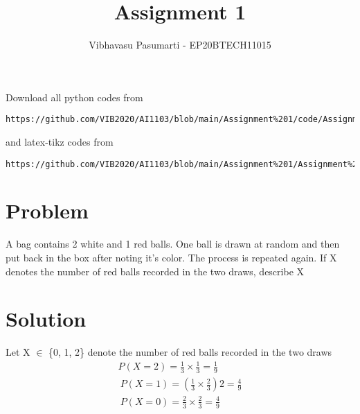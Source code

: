 \documentclass[journal,12pt,twocolumn]{IEEEtran}
\begin{document}
\title{Assignment 1}
\author{Vibhavasu Pasumarti - EP20BTECH11015}
\maketitle
\newpage
\bigskip
\renewcommand{\thefigure}{\theenumi}
\renewcommand{\thetable}{\theenumi}
Download all python codes from 
\begin{lstlisting}
https://github.com/VIB2020/AI1103/blob/main/Assignment%201/code/Assignment_1.py
\end{lstlisting}
%
and latex-tikz codes from 
%
\begin{lstlisting}
https://github.com/VIB2020/AI1103/blob/main/Assignment%201/Assignment%201.tex
\end{lstlisting}
\section{Problem}
A bag contains 2 white and 1 red balls. One ball is 
drawn at random and then put back in the box after 
noting it's color. The process is repeated again. 
If X denotes the number of red balls recorded in the
two draws, describe X
\section{Solution}
Let X $\in$ \{0, 1, 2\}  denote the number of red balls recorded in 
the two draws\\
\begin{align}
P(X = 2) = \frac{1}{3} \times \frac{1}{3} = \frac{1}{9}\\\
P(X = 1) = \left(\frac{1}{3} \times \frac{2}{3}\right) 2 = \frac{4}{9}\\\
P(X = 0) = \frac{2}{3} \times \frac{2}{3} = \frac{4}{9}
\end{align}
\end{document}
